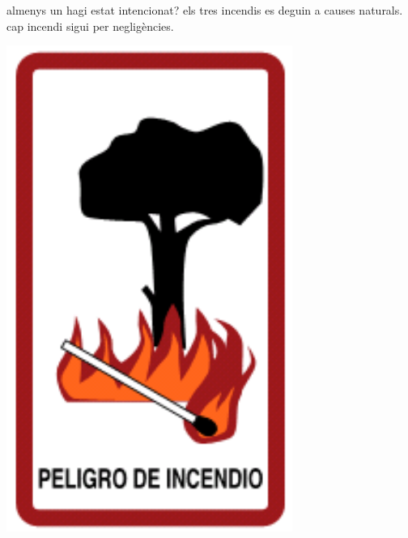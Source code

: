 \begin{mylist}
 
 \begin{minipage}{0.8\textwidth}
	\begin{tasks}
		\task  almenys un hagi estat intencionat?
		\task  els tres incendis es deguin a causes naturals.
		\task  cap incendi sigui per negligències.
	\end{tasks}
\end{minipage}
\begin{minipage}{0.15\textwidth}
	\centering
	\includegraphics[width=0.7\textwidth]{img-04/incendi}
\end{minipage}



\end{mylist}
